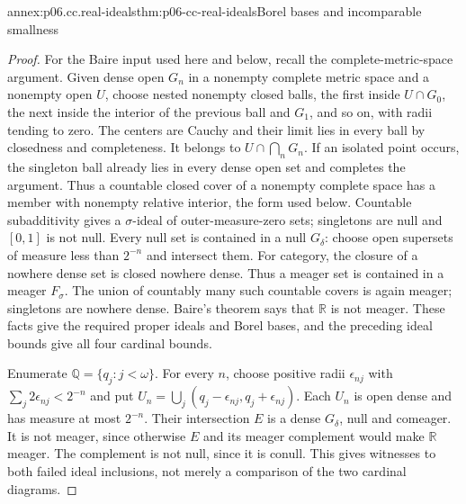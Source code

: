 \begin{annexitem}{annex:p06.cc.real-ideals}{thm:p06-cc-real-ideals}{Borel bases and incomparable smallness}
\begin{proof}
For the Baire input used here and below, recall the complete-metric-space
argument. Given dense open \(G_n\) in a nonempty complete metric space
and a nonempty open \(U\), choose nested nonempty closed balls, the
first inside \(U\cap G_0\), the next inside the interior of the previous
ball and \(G_1\), and so on, with radii tending to zero. The centers
are Cauchy and their limit lies in every ball by closedness and completeness.
It belongs to \(U\cap\bigcap_nG_n\). If an isolated point occurs,
the singleton ball already lies in every dense open set and completes
the argument. Thus a countable closed cover of a nonempty complete
space has a member with nonempty relative interior, the form used below.
Countable subadditivity gives a \(\sigma\)-ideal of outer-measure-zero
sets; singletons are null and \([0,1]\) is not null. Every null set is
contained in a null \(G_\delta\): choose open supersets of measure
less than \(2^{-n}\) and intersect them. For category, the closure of
a nowhere dense set is closed nowhere dense. Thus a meager set is
contained in a meager \(F_\sigma\). The union of countably many such
countable covers is again meager; singletons are nowhere dense.
Baire's theorem says that \(\mathbb R\) is not meager. These facts
give the required proper ideals and Borel bases, and the preceding ideal
bounds give all four cardinal bounds.

Enumerate \(\mathbb Q=\{q_j:j<\omega\}\). For every \(n\), choose
positive radii \(\epsilon_{nj}\) with
\(\sum_j2\epsilon_{nj}<2^{-n}\) and put
\(U_n=\bigcup_j(q_j-\epsilon_{nj},q_j+\epsilon_{nj})\).
Each \(U_n\) is open dense and has measure at most \(2^{-n}\).
Their intersection \(E\) is a dense \(G_\delta\), null and comeager.
It is not meager, since otherwise \(E\) and its meager complement
would make \(\mathbb R\) meager. The complement is not null, since
it is conull. This gives witnesses to both failed ideal inclusions,
not merely a comparison of the two cardinal diagrams.
\end{proof}
\end{annexitem}

